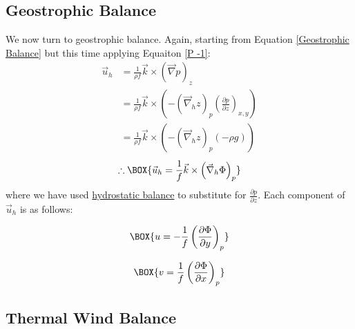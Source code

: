 \subsection{Geostrophic Balance}

We now turn to geostrophic balance. Again, starting from Equation \ref{Geostrophic Balance} but this time applying Equaiton \ref{P -1}:
\begin{align*}
    \vec{u}_h &= \frac{1}{\rho f}\vec{k}\times\left(\vec{\nabla}p\right)_z
    \\
    &=\frac{1}{\rho f}\vec{k}\times\left( 
        -\left( \vec{\nabla}_h z \right)_p \left( \frac{\partial p}{\partial z} \right)_{x,y}
     \right)
    \\
    &=\frac{1}{\rho f}\vec{k}\times\left( 
        -\left( \vec{\nabla}_h z \right)_p (-\rho g)
    \right)
\end{align*}
\begin{align}
    \label{Geostrophic Pressure}
    \therefore \BOX{
        \vec{u}_h = \frac{1}{f}\vec{k}\times\left( \vec{\nabla}_h \Phi \right)_p
    }
\end{align}
where we have used \hyperref[Hydrostatic GFD Box]{hydrostatic balance} to substitute for $\frac{\partial p}{\partial z}$. Each component of $\vec{u}_h$ is as follows:

\begin{minipage}{.48\linewidth}
    \begin{align*}
        \BOX{
            u = -\frac{1}{f}\left( \frac{\partial \Phi}{\partial y} \right)_p
        }
    \end{align*}
\end{minipage}
\hfill
\begin{minipage}{.48\linewidth}
    \begin{align*}
        \BOX{
            v = \frac{1}{f}\left( \frac{\partial \Phi}{\partial x} \right)_p
        }
    \end{align*}
\end{minipage}

\subsection{Thermal Wind Balance}


